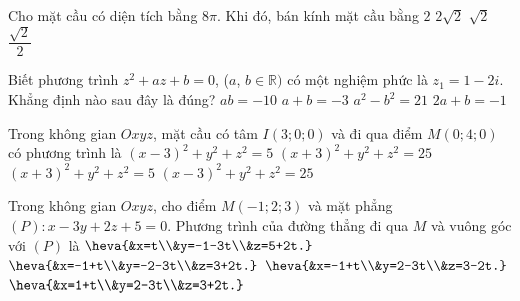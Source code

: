 \begin{ex}%
	Cho mặt cầu có diện tích bằng $8\pi$. Khi đó, bán kính mặt cầu bằng
	\choice
	{$2$}
	{$2\sqrt{2}$}
	{\True $\sqrt{2}$}
	{$\dfrac{\sqrt{2}}{2}$}
\end{ex}

\begin{ex}%
	Biết phương trình $z^2+az+b=0$, ($a$, $b\in\mathbb{R})$ có một nghiệm phức là $z_1=1-2i$. Khẳng định nào sau đây là đúng?
	\choice
	{\True $ab=-10$}
	{$a+b=-3$}
	{$a^2-b^2=21$}
	{$2a+b=-1$}
\end{ex}

\begin{ex}%
	Trong không gian $Oxyz$, mặt cầu có tâm $I(3;0;0)$ và đi qua điểm $M(0;4;0)$ có phương trình là
	\choice
	{$(x-3)^2+y^2+z^2=5$}
	{$(x+3)^2+y^2+z^2=25$}
	{$(x+3)^2+y^2+z^2=5$}
	{\True $(x-3)^2+y^2+z^2=25$}
\end{ex}

\begin{ex}%
	Trong không gian $Oxyz$, cho điểm $M(-1;2;3)$ và mặt phẳng $(P)\colon x-3y+2z+5=0$. Phương trình của đường thẳng đi qua $M$ và vuông góc với $(P)$ là
	\def\dotEX{}
	\choice
	{\True $\heva{&x=t\\&y=-1-3t\\&z=5+2t.}$}
	{$\heva{&x=-1+t\\&y=-2-3t\\&z=3+2t.}$}
	{$\heva{&x=-1+t\\&y=2-3t\\&z=3-2t.}$}
	{$\heva{&x=1+t\\&y=2-3t\\&z=3+2t.}$}
\end{ex}

